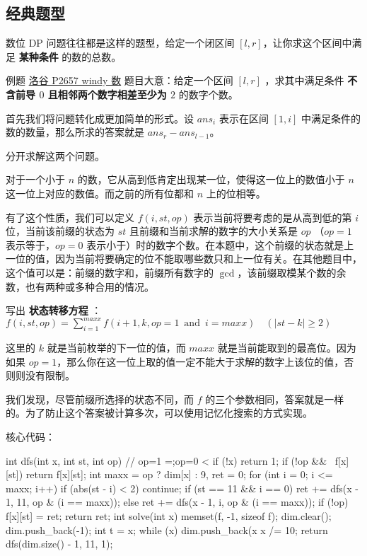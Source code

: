 
\subsection{经典题型}

数位 DP 问题往往都是这样的题型，给定一个闭区间 $[l,r]$，让你求这个区间中满足 \textbf{某种条件} 的数的总数。

\begin{NOTE}{例题 \href{https://www.luogu.org/problemnew/show/P2657}{洛谷 P2657 windy 数}}{}
题目大意：给定一个区间 $[l,r]$ ，求其中满足条件 \textbf{不含前导 $0$ 且相邻两个数字相差至少为 $2$} 的数字个数。

\end{NOTE}


首先我们将问题转化成更加简单的形式。设 $ans_i$ 表示在区间 $[1,i]$ 中满足条件的数的数量，那么所求的答案就是 $ans_r-ans_{l-1}$。

分开求解这两个问题。

对于一个小于 $n$ 的数，它从高到低肯定出现某一位，使得这一位上的数值小于 $n$ 这一位上对应的数值。而之前的所有位都和 $n$ 上的位相等。

有了这个性质，我们可以定义 $f(i,st,op)$ 表示当前将要考虑的是从高到低的第 $i$ 位，当前该前缀的状态为 $st$ 且前缀和当前求解的数字的大小关系是 $op$ （$op=1$ 表示等于，$op=0$ 表示小于）时的数字个数。在本题中，这个前缀的状态就是上一位的值，因为当前将要确定的位不能取哪些数只和上一位有关。在其他题目中，这个值可以是：前缀的数字和，前缀所有数字的 $\gcd$，该前缀取模某个数的余数，也有两种或多种合用的情况。

写出 \textbf{状态转移方程} ： $f(i,st,op)=\sum_{i=1}^{maxx} f(i+1,k,op=1~ \operatorname{and}~ i=maxx )\quad (|st-k|\ge 2)$

这里的 $k$ 就是当前枚举的下一位的值，而 $maxx$ 就是当前能取到的最高位。因为如果 $op=1$，那么你在这一位上取的值一定不能大于求解的数字上该位的值，否则则没有限制。

我们发现，尽管前缀所选择的状态不同，而 $f$ 的三个参数相同，答案就是一样的。为了防止这个答案被计算多次，可以使用记忆化搜索的方式实现。

核心代码：

\begin{cppcode}
int dfs(int x, int st, int op)  // op=1 =;op=0 <
{
  if (!x) return 1;
  if (!op && ~f[x][st]) return f[x][st];
  int maxx = op ? dim[x] : 9, ret = 0;
  for (int i = 0; i <= maxx; i++) {
    if (abs(st - i) < 2) continue;
    if (st == 11 && i == 0)
      ret += dfs(x - 1, 11, op & (i == maxx));
    else
      ret += dfs(x - 1, i, op & (i == maxx));
  }
  if (!op) f[x][st] = ret;
  return ret;
}
int solve(int x) {
  memset(f, -1, sizeof f);
  dim.clear();
  dim.push_back(-1);
  int t = x;
  while (x) {
    dim.push_back(x %
    x /= 10;
  }
  return dfs(dim.size() - 1, 11, 1);
}
\end{cppcode}

